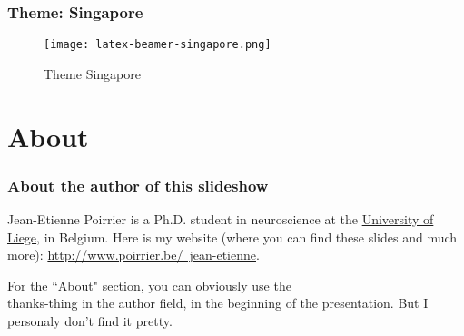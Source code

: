\documentclass{beamer}
\begin{document}
\frame
{
	\frametitle{Theme: Singapore}
	\begin{figure}
	\centering
	\texttt{[image: latex-beamer-singapore.png]}
	\caption{Theme Singapore}
	\end{figure}
}

\section{About}

\frame
{
	\frametitle{About the author of this slideshow}

	Jean-Etienne Poirrier is a Ph.D. student in neuroscience at the \href{http://www.ulg.ac.be/}{University of Liege}, in Belgium. Here is my website (where you can find these slides and much more): \href{http://www.poirrier.be/~jean-etienne}{http://www.poirrier.be/~jean-etienne}.

	For the ``About" section, you can obviously use the \\thanks-thing in the author field, in the beginning of the presentation. But I personaly don't find it pretty.
}
\end{document}

